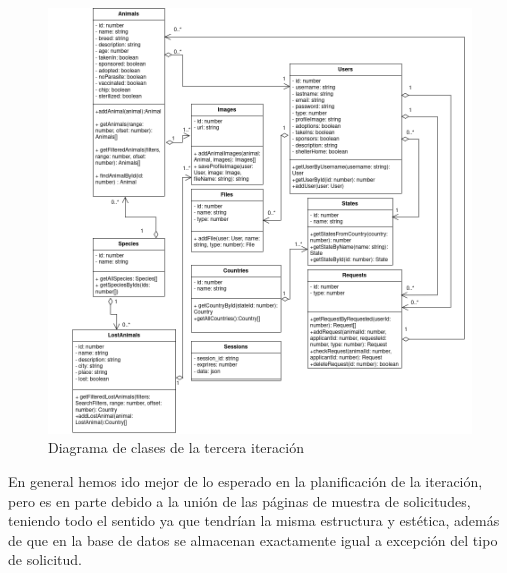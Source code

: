 \begin{figure}[H]
	\centering
	\includegraphics[width=0.7\linewidth]{"sprint 3/clases"}
	\caption{Diagrama de clases de la tercera iteración}
	\label{fig:clases3}
\end{figure}


En general hemos ido mejor de lo esperado en la planificación de la iteración, pero es en parte debido a la unión de las páginas de muestra de solicitudes, teniendo todo el sentido ya que tendrían la misma estructura y estética, además de que en la base de datos se almacenan exactamente igual a excepción del tipo de solicitud. 






















